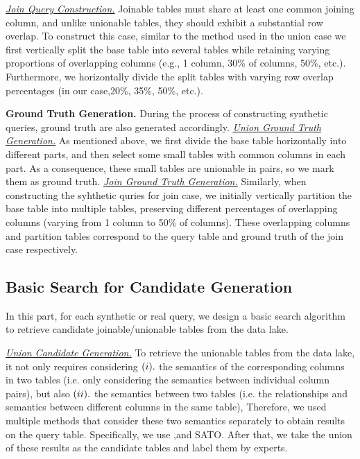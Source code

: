 \noindent \underline{\textit{Join Query Construction.}}  Joinable tables must share at least one common joining column, and unlike unionable tables, they should exhibit a substantial row overlap. To construct this case, similar to the method used in the union case we first vertically split the base table into several tables while retaining varying proportions of overlapping columns (e.g., 1 column, 30\% of columns, 50\%, etc.). Furthermore, we horizontally divide the split tables with varying row overlap percentages (in our case,20\%, 35\%, 50\%, etc.). 

\noindent \textbf{Ground Truth Generation.} 
During the process of constructing synthetic queries, ground truth are also generated accordingly.
\noindent \underline{\textit{Union Ground Truth Generation.}}  
As mentioned above, we first divide the base table horizontally into different parts, and then select some small tables with common columns in each part. As a consequence, these small tables are unionable in pairs, so we mark them as ground truth.
\noindent \underline{\textit{Join Ground Truth Generation.}} 
Similarly, when constructing the syhthetic quries for join case, we initially vertically partition the base table into multiple tables, preserving different percentages of overlapping columns (varying from 1 column to 50\% of columns). These overlapping columns and partition tables correspond to the query table and ground truth of the join case respectively.


\subsection{Basic Search for Candidate Generation}
In this part, for each synthetic or real query, we design a basic search algorithm to retrieve  candidate joinable/unionable tables from the data lake. 

\noindent \underline{\textit{Union Candidate Generation.}}  
To retrieve the unionable tables from the data lake, it not only requires considering $(\romannumeral1 ).$  the semantics of the corresponding columns in two tables (i.e. only considering the semantics between individual column pairs), but also $(\romannumeral2 ).$ the semantics between two tables (i.e. the relationships and semantics between different columns in the same table),  Therefore, we used multiple methods that consider these two semantics separately to obtain results on the query table. Specifically, we use \starmie,\santos and SATO. After that, we take the union of these results as the candidate tables and label them by experts.

